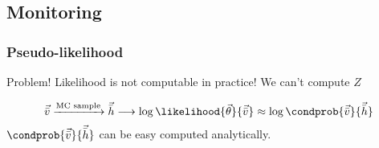 \subsection{Monitoring}
\begin{frame}
  \frametitle{Pseudo-likelihood}

  \begin{alertblock}{Problem!}
    Likelihood is not computable in practice! We can't compute \(Z\)
  \end{alertblock}
  \[
    \vec{\bar{v}} \xrightarrow{\text{MC sample}} \vec{\bar{h}} \longrightarrow \log\likelihood{\vec{\theta}}{\vec{\bar{v}}} \approx \log{\condprob{\vec{\bar{v}}}{\vec{\bar{h}}}}
  \]
  \(\condprob{\vec{\bar{v}}}{\vec{\bar{h}}}\) can be easy computed analytically.
\end{frame}
